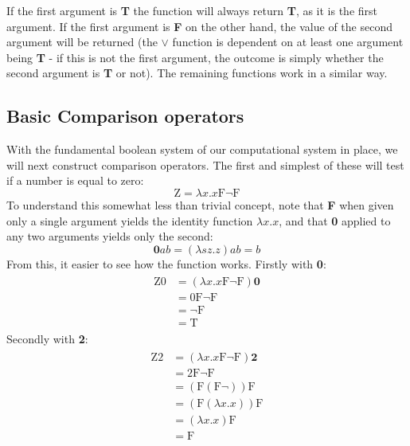 \documentclass[Master.tex]{subfiles}
\begin{document}
If the first argument is \textbf{T} the function will always return \textbf{T}, as it is the first argument. If the first argument is \textbf{F} on the other hand, the value of the second argument will be returned (the $\vee$ function is dependent on at least one argument being \textbf{T} - if this is not the first argument, the outcome is simply whether the second argument is \textbf{T} or not). The remaining functions work in a similar way.

\subsection{Basic Comparison operators}

With the fundamental boolean system of our computational system in place, we will next construct comparison operators. The first and simplest of these will test if a number is equal to zero:
\cite{rojas2015lambdatutorial}
\begin{equation*}
\bm{\mathrm{Z}} = \lambda x.x\bm{\mathrm{F\lnot F}}
\end{equation*}
To understand this somewhat less than trivial concept, note that \textbf{F} when given only a single argument yields the identity function $\lambda x.x$, and that \textbf{0} applied to any two arguments yields only the second:
\cite{rojas2015lambdatutorial}
\begin{equation*}
\bm{0}ab = (\lambda sz.z)ab = b
\end{equation*}
From this, it easier to see how the function works. Firstly with \textbf{0}:
\cite{rojas2015lambdatutorial}
\begin{gather*}
\begin{aligned}
\bm{\mathrm{Z0}} &= (\lambda x.x\bm{\mathrm{F\lnot F}})\bm{0}\\
&= \bm{\mathrm{0F\lnot F}}\\
&= \bm{\mathrm{\lnot F}}\\
&= \bm{\mathrm{T}}
\end{aligned}
\end{gather*}
Secondly with \textbf{2}:
\begin{gather*}
\begin{aligned}
\bm{\mathrm{Z2}} &= (\lambda x.x\bm{\mathrm{F\lnot F}})\bm{2}\\
&= \bm{\mathrm{2F\lnot F}}\\
&= (\bm{\mathrm{F}}(\bm{\mathrm{F}}\lnot)) \bm{\mathrm{F}}\\
&= (\bm{\mathrm{F}}(\lambda x.x))\bm{\mathrm{F}}\\
&= (\lambda x.x)\bm{\mathrm{F}}\\
&= \bm{\mathrm{F}} 
\end{aligned}
\end{gather*}
\end{document}
